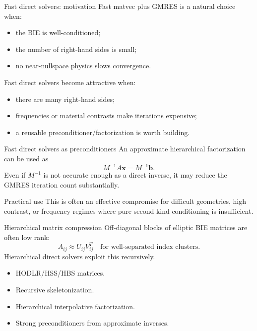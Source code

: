 \documentclass[aspectratio=169,11pt]{beamer}
\begin{document}
\begin{frame}{Fast direct solvers: motivation}
\small
Fast matvec plus GMRES is a natural choice when:
\begin{itemize}
  \item the BIE is well-conditioned;
  \item the number of right-hand sides is small;
  \item no near-nullspace physics slows convergence.
\end{itemize}

Fast direct solvers become attractive when:
\begin{itemize}
  \item there are many right-hand sides;
  \item frequencies or material contrasts make iterations expensive;
  \item a reusable preconditioner/factorization is worth building.
\end{itemize}
\end{frame}

\begin{frame}{Fast direct solvers as preconditioners}
\small
An approximate hierarchical factorization can be used as
\[
M^{-1}A\bm x=M^{-1}\bm b.
\]
Even if $M^{-1}$ is not accurate enough as a direct inverse, it may reduce the
GMRES iteration count substantially.

\begin{block}{Practical use}
This is often an effective compromise for difficult geometries, high contrast,
or frequency regimes where pure second-kind conditioning is insufficient.
\end{block}
\end{frame}

\begin{frame}{Hierarchical matrix compression}
\small
Off-diagonal blocks of elliptic BIE matrices are often low rank:
\[
  A_{ij}\approx U_{ij}V_{ij}^T
  \quad\text{for well-separated index clusters}.
\]
Hierarchical direct solvers exploit this recursively.

\begin{itemize}
  \item HODLR/HSS/HBS matrices.
  \item Recursive skeletonization.
  \item Hierarchical interpolative factorization.
  \item Strong preconditioners from approximate inverses.
\end{itemize}
\end{frame}
\end{document}
